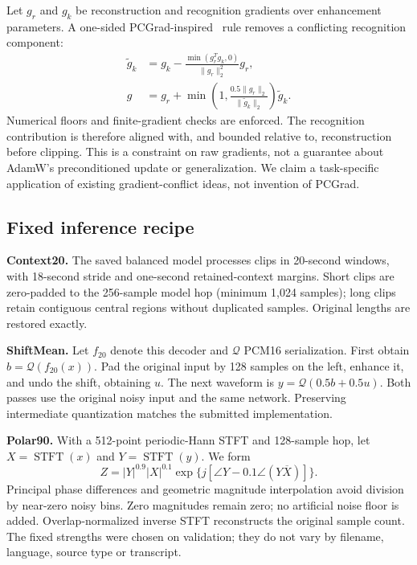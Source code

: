 \documentclass[conference]{IEEEtran}
\begin{document}
Let $g_r$ and $g_k$ be reconstruction and recognition gradients over enhancement parameters. A one-sided PCGrad-inspired~\cite{pcgrad} rule removes a conflicting recognition component:
\begin{align}
\tilde{g}_k&=g_k-\frac{\min(g_r^T g_k,0)}{\|g_r\|_2^2}g_r,\\
g&=g_r+\min\!\left(1,\frac{0.5\|g_r\|_2}{\|\tilde{g}_k\|_2}\right)\tilde{g}_k.
\end{align}
Numerical floors and finite-gradient checks are enforced. The recognition contribution is therefore aligned with, and bounded relative to, reconstruction before clipping. This is a constraint on raw gradients, not a guarantee about AdamW's preconditioned update or generalization. We claim a task-specific application of existing gradient-conflict ideas, not invention of PCGrad.

\subsection{Fixed inference recipe}
\textbf{Context20.} The saved balanced model processes clips in 20-second windows, with 18-second stride and one-second retained-context margins. Short clips are zero-padded to the 256-sample model hop (minimum 1,024 samples); long clips retain contiguous central regions without duplicated samples. Original lengths are restored exactly.

\textbf{ShiftMean.} Let $f_{20}$ denote this decoder and $\mathcal{Q}$ PCM16 serialization. First obtain $b=\mathcal{Q}(f_{20}(x))$. Pad the original input by 128 samples on the left, enhance it, and undo the shift, obtaining $u$. The next waveform is $y=\mathcal{Q}(0.5b+0.5u)$. Both passes use the original noisy input and the same network. Preserving intermediate quantization matches the submitted implementation.

\textbf{Polar90.} With a 512-point periodic-Hann STFT and 128-sample hop, let $X=\operatorname{STFT}(x)$ and $Y=\operatorname{STFT}(y)$. We form
\begin{equation}
Z=|Y|^{0.9}|X|^{0.1}\exp\{j[\angle Y-0.1\angle(Y\overline X)]\}.
\end{equation}
Principal phase differences and geometric magnitude interpolation avoid division by near-zero noisy bins. Zero magnitudes remain zero; no artificial noise floor is added. Overlap-normalized inverse STFT reconstructs the original sample count. The fixed strengths were chosen on validation; they do not vary by filename, language, source type or transcript.
\end{document}
